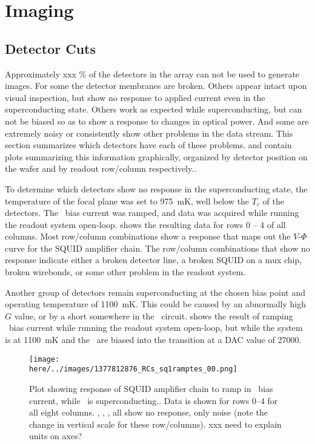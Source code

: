 \chapter{Imaging}\label{c:imaging}

\section{Detector Cuts}

Approximately xxx \% of the detectors in the array can not be used to generate images.
For some the detector membranes are broken.
Others appear intact upon visual inspection, but show no response to applied current even in the superconducting state.
Others work as expected while superconducting, but can not be biased so as to show a response to changes in optical power. 
And some are extremely noisy or consistently show other problems in the data stream.
This section summarizes which detectors have each of these problems.
 and  contain plots summarizing this information graphically, organized by detector position on the wafer and by readout row/column respectively..

To determine which detectors show no response in the superconducting state, the temperature of the focal plane was set to 975~mK, well below the $T_c$ of the detectors.
The \TES\ bias current was ramped, and data was acquired while running the readout system open-loop.
 shows the resulting data for rows 0 -- 4 of all columns.
Most row/column combinations show a response that maps out the $V$-$\Phi$ curve for the SQUID amplifier chain.
The row/column combinations that show no response indicate either a broken detector line, a broken SQUID on a mux chip, broken wirebonds, or some other problem in the readout system.

Another group of detectors remain superconducting at the chosen bias point and operating temperature of 1100~mK.
This could be caused by an abnormally high $G$ value, or by a short somewhere in the \TES\ circuit.
 shows the result of ramping \TES\ bias current while running the readout system open-loop, but while the system is at 1100~mK and the \TESs\ are biased into the transition at a DAC value of 27000.

\begin{figure*}[th]
\centering
\texttt{[image: \\here/../images/1377812876\_RCs\_sq1ramptes\_00.png]}
\caption{Plot showing response of SQUID amplifier chain to ramp in \TES\ bias current, while \TES\ is superconducting.. Data is shown for rows 0--4 for all eight columns. , , ,  all show no response, only noise (note the change in vertical scale for these row/columns). xxx need to explain units on axes?}
\label{fig:tes-bias-ramp-sc}
\end{figure*}

